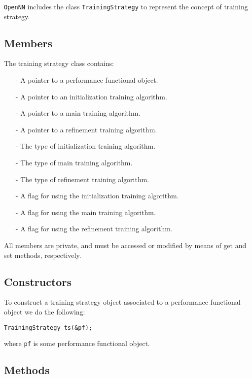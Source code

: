 \texttt{OpenNN} includes the class \lstinline"TrainingStrategy" to represent the concept of training strategy. 

\subsection*{Members}

The training strategy class contains:

\begin{itemize}
\item[-] A pointer to a performance functional object.
\item[-] A pointer to an initialization training algorithm.
\item[-] A pointer to a main training algorithm.
\item[-] A pointer to a refinement training algorithm.
\item[-] The type of initialization training algorithm.
\item[-] The type of main training algorithm.
\item[-] The type of refinement training algorithm.
\item[-] A flag for using the initialization training algorithm.
\item[-] A flag for using the main training algorithm.
\item[-] A flag for using the refinement training algorithm.
\end{itemize}

All members are private, and must be accessed or modified by means of get and set methods, respectively. 

\subsection*{Constructors}

To construct a training strategy object associated to a performance functional object we do the following:

\begin{lstlisting}
TrainingStrategy ts(&pf);
\end{lstlisting}

\noindent where \lstinline"pf" is some performance functional object. 

\subsection*{Methods}

